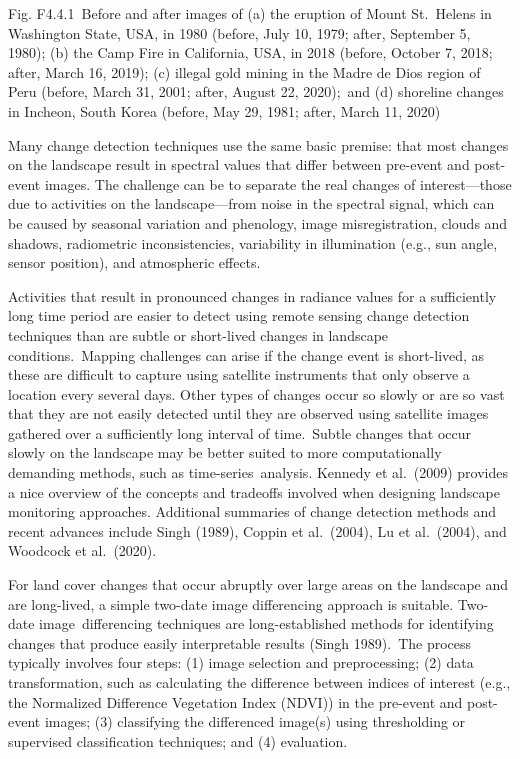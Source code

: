 \documentclass[
  letterpaper,
  DIV=11,
  numbers=noendperiod]{scrreprt}
\begin{document}
Fig. F4.4.1~Before and after images of (a) the eruption of Mount
St.~Helens in Washington State, USA, in 1980 (before, July 10, 1979;
after, September 5, 1980); (b) the Camp Fire in California, USA, in 2018
(before, October 7, 2018; after, March 16, 2019); (c) illegal gold
mining in the Madre de Dios region of Peru (before, March 31, 2001;
after, August 22, 2020);~and (d) shoreline changes in Incheon, South
Korea (before, May 29, 1981; after, March 11, 2020)

Many change detection techniques use the same basic premise: that most
changes on the landscape result in spectral values that differ between
pre-event and post-event images. The challenge can be to separate the
real changes of interest---those due to activities on the
landscape---from noise in the spectral signal, which can be caused by
seasonal variation and phenology, image misregistration, clouds and
shadows, radiometric inconsistencies, variability in illumination (e.g.,
sun angle, sensor position), and atmospheric effects.

Activities that result in pronounced changes in radiance values for a
sufficiently long time period are easier to detect using remote sensing
change detection techniques than are subtle or short-lived changes in
landscape conditions.~Mapping challenges can arise if the change event
is short-lived, as these are difficult to capture using satellite
instruments that only observe a location every several days. Other types
of changes occur so slowly or are so vast that they are not easily
detected until they are observed using satellite images gathered over a
sufficiently long interval of time.~Subtle changes that occur slowly on
the landscape may be better suited to more computationally demanding
methods, such as time-series~analysis. Kennedy et al.~(2009) provides a
nice overview of the concepts and tradeoffs involved when designing
landscape monitoring approaches. Additional summaries of change
detection methods and recent advances include Singh (1989), Coppin et
al.~(2004), Lu et al.~(2004), and Woodcock et al.~(2020).

For land cover changes that occur abruptly over large areas on the
landscape and are long-lived, a simple two-date image differencing
approach is suitable. Two-date image~differencing techniques are
long-established methods for identifying changes that produce easily
interpretable results (Singh 1989).~The process typically involves four
steps: (1) image selection and preprocessing; (2) data transformation,
such as calculating the difference between indices of interest (e.g.,
the Normalized Difference Vegetation Index (NDVI)) in the pre-event and
post-event images; (3) classifying the differenced image(s) using
thresholding or supervised classification techniques; and (4)
evaluation.
\end{document}
